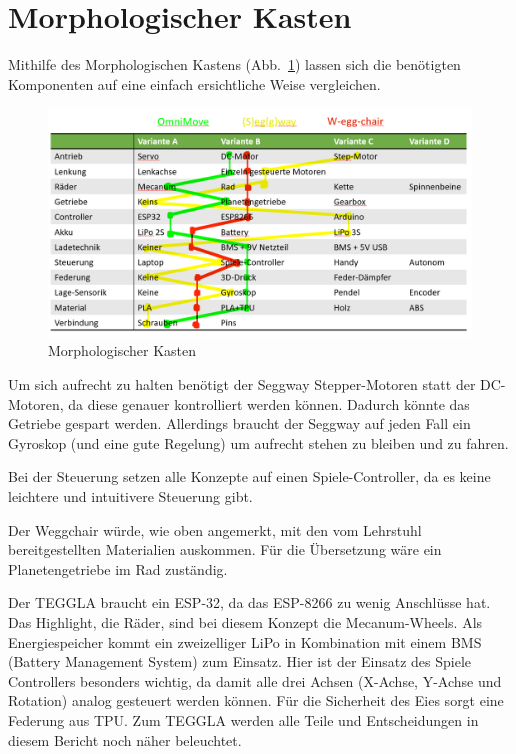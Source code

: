 \section{Morphologischer Kasten}
Mithilfe des Morphologischen Kastens (Abb.~\ref{bild:morphkasten}) lassen sich die benötigten Komponenten auf eine einfach ersichtliche Weise vergleichen.
\begin{figure}[H]
	\centering
	\includegraphics[width=\textwidth]{bilder/morphkasten.png}
	\caption{Morphologischer Kasten}
	\label{bild:morphkasten}
\end{figure}
Um sich aufrecht zu halten benötigt der Seggway Stepper-Motoren statt der DC-Motoren, da diese genauer kontrolliert werden können.
Dadurch könnte das Getriebe gespart werden. Allerdings braucht der Seggway auf jeden Fall ein Gyroskop (und eine gute Regelung) um aufrecht stehen zu bleiben und zu fahren. 

Bei der Steuerung setzen alle Konzepte auf einen Spiele-Controller, da es keine leichtere und intuitivere Steuerung gibt.

Der Weggchair würde, wie oben angemerkt, mit den vom Lehrstuhl bereitgestellten Materialien auskommen. Für die Übersetzung wäre ein Planetengetriebe im Rad zuständig. 

Der TEGGLA braucht ein ESP-32, da das ESP-8266 zu wenig Anschlüsse hat. Das Highlight, die Räder, sind bei diesem Konzept die Mecanum-Wheels. Als Energiespeicher kommt ein zweizelliger LiPo in Kombination mit einem BMS (Battery Management System) zum Einsatz. Hier ist der Einsatz des Spiele Controllers besonders wichtig, da damit alle drei Achsen (X-Achse, Y-Achse und Rotation) analog gesteuert werden können. Für die Sicherheit des Eies sorgt eine Federung aus TPU. Zum TEGGLA werden alle Teile und Entscheidungen in diesem Bericht noch näher beleuchtet. 



